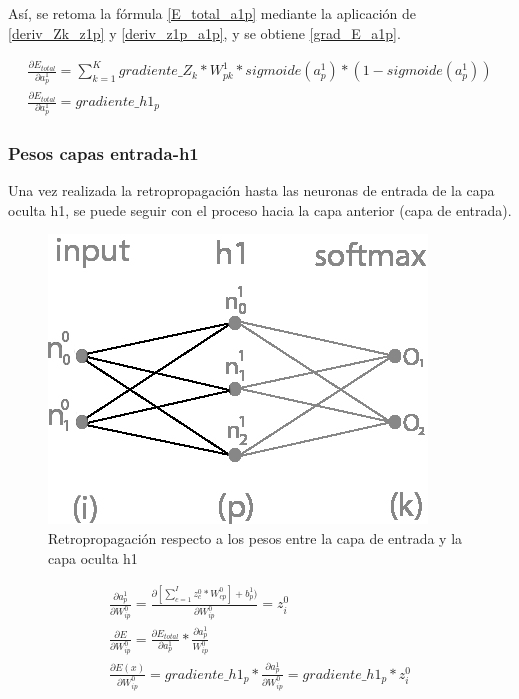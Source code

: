 Así, se retoma la fórmula \ref{E_total_a1p} mediante la aplicación de \ref{deriv_Zk_z1p} y \ref{deriv_z1p_a1p}, y se obtiene \ref{grad_E_a1p}.

\begin{gather}
	\frac{\partial E_{total}}{\partial a^1_p} = \sum_{k=1}^K  gradiente\_Z_k * W^1_{pk} * sigmoide(a^1_p)*(1-sigmoide(a^1_p)) \label{grad_E_a1p} \\
	\frac{\partial E_{total}}{\partial a^1_p} = gradiente\_h1_p
\end{gather}

\subsubsection{Pesos capas entrada-h1}

Una vez realizada la retropropagación hasta las neuronas de entrada de la capa oculta h1, se puede seguir con el proceso hacia la capa anterior (capa de entrada).

\begin{figure}[H]
	\centering
	\includegraphics[scale=0.35]{imagenes/nn_1_capa_pesos_input_h1.jpg}  
	\caption{Retropropagación respecto a los pesos entre la capa de entrada y la capa oculta h1}
	\label{fig:nn_1_pesos_input_h1}
\end{figure}


\begin{gather}
	\frac{\partial a^1_p }{\partial W^0_{ip} } = \frac{\partial [\sum_{c=1}^{I} z^0_c * W^0_{cp}] + b^1_p)}{\partial W^0_{ip} } = z^0_i \label{grad_w0ip_1} \\
	\frac{\partial E}{\partial W^0_{ip}} = \frac{\partial E_{total} }{\partial a^1_p } * \frac{\partial a^1_p}{W^0_{ip}} \label{grad_w0ip_2} \\
	\frac{\partial E(x) }{\partial W^0_{ip} } = gradiente\_h1_p * \frac{\partial a^1_p }{\partial W^0_{ip} } = gradiente\_h1_p * z^0_i 
	\label{grad_w0ip_3}
\end{gather}

